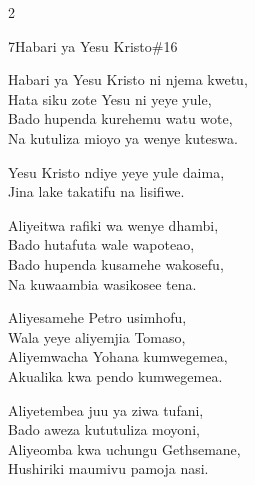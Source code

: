\begin{multicols}{2}
\begin{hymn}{7}{Habari ya Yesu Kristo}{\#16}
\begin{stanza}
Habari ya Yesu Kristo ni njema kwetu,\\
Hata siku zote Yesu ni yeye yule,\\
Bado hupenda kurehemu watu wote,\\
Na kutuliza mioyo ya wenye kuteswa.
\end{stanza}
\begin{chorus}
Yesu Kristo ndiye yeye yule daima,\\
Jina lake takatifu na lisifiwe.
\end{chorus}
\begin{stanza}
Aliyeitwa rafiki wa wenye dhambi,\\
Bado hutafuta wale wapoteao,\\
Bado hupenda kusamehe wakosefu,\\
Na kuwaambia wasikosee tena.
\end{stanza}
\begin{stanza}
Aliyesamehe Petro usimhofu,\\
Wala yeye aliyemjia Tomaso,\\
Aliyemwacha Yohana kumwegemea,\\
Akualika kwa pendo kumwegemea.
\end{stanza}
\begin{stanza}
Aliyetembea juu ya ziwa tufani,\\
Bado aweza kututuliza moyoni,\\
Aliyeomba kwa uchungu Gethsemane,\\
Hushiriki maumivu pamoja nasi.
\end{stanza}
\end{hymn}


\end{multicols}

